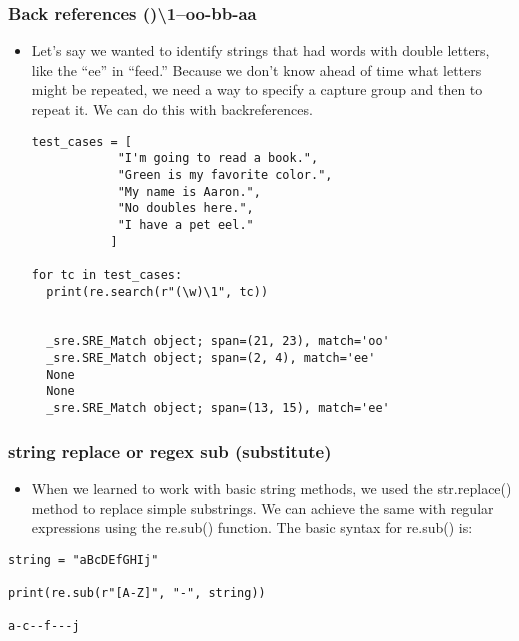 \documentclass[11pt]{article}
\providecommand{\tightlist}{%
      \setlength{\itemsep}{0pt}\setlength{\parskip}{0pt}}
\begin{document}
\hypertarget{back-references-1oo-bb-aa}{%
\subsubsection{\texorpdfstring{Back references
(\w)\textbackslash{}1--oo-bb-aa}{Back references ()\textbackslash{}1--oo-bb-aa}}\label{back-references-1oo-bb-aa}}

\begin{itemize}
\item
  Let's say we wanted to identify strings that had words with double
  letters, like the ``ee'' in ``feed.'' Because we don't know ahead of
  time what letters might be repeated, we need a way to specify a
  capture group and then to repeat it. We can do this with
  backreferences.

\begin{verbatim}
test_cases = [
            "I'm going to read a book.",
            "Green is my favorite color.",
            "My name is Aaron.",
            "No doubles here.",
            "I have a pet eel."
           ]

for tc in test_cases:
  print(re.search(r"(\w)\1", tc))


  _sre.SRE_Match object; span=(21, 23), match='oo'
  _sre.SRE_Match object; span=(2, 4), match='ee'
  None
  None
  _sre.SRE_Match object; span=(13, 15), match='ee'
\end{verbatim}
\end{itemize}

\hypertarget{string-replace-or-regex-sub-substitute}{%
\subsubsection{string replace or regex sub
(substitute)}\label{string-replace-or-regex-sub-substitute}}

\begin{itemize}
\tightlist
\item
  When we learned to work with basic string methods, we used the
  str.replace() method to replace simple substrings. We can achieve the
  same with regular expressions using the re.sub() function. The basic
  syntax for re.sub() is:
\end{itemize}

\begin{verbatim}
string = "aBcDEfGHIj"

print(re.sub(r"[A-Z]", "-", string))

a-c--f---j
\end{verbatim}
\end{document}
